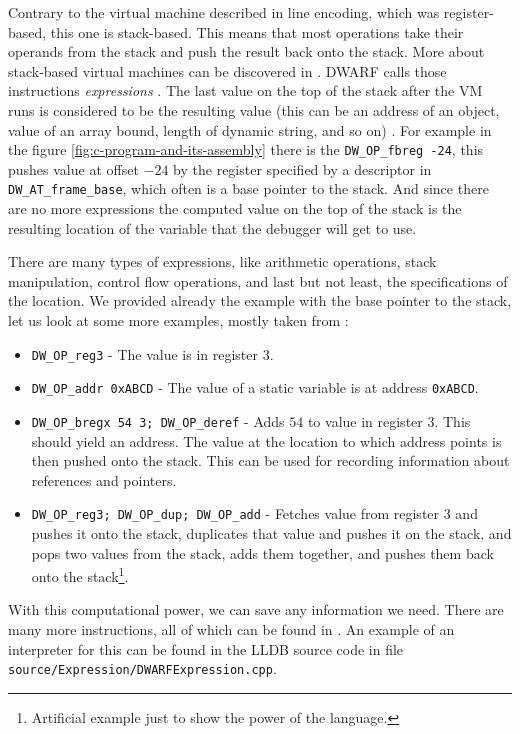 Contrary to the virtual machine described in line encoding, which was
register-based, this one is stack-based. This means that most operations take
their operands from the stack and push the result back onto the stack. More
about stack-based virtual machines can be discovered in
\cite{crafting-interpreters}. DWARF calls those instructions
\textit{expressions} \cite{dwarf}. The last value on the top of the stack after
the VM runs is considered to be the resulting value (this can be an address of
an object, value of an array bound, length of dynamic string, and so on)
\cite{dwarf}. For example in the figure \ref{fig:c-program-and-its-assembly}
there is the \texttt{DW\_OP\_fbreg -24}, this pushes value at offset $-24$ by
the register specified by a descriptor in \texttt{DW\_AT\_frame\_base}, which
often is a base pointer to the stack. And since there are no more expressions
the computed value on the top of the stack is the resulting location of the
variable that the debugger will get to use.

There are many types of expressions, like arithmetic operations, stack
manipulation, control flow operations, and last but not least, the
specifications of the location. We provided already the example with the base
pointer to the stack, let us look at some more examples, mostly taken from
\cite{dwarf}:
\begin{itemize}
    \item \texttt{DW\_OP\_reg3} - The value is in register $3$.
    \item \texttt{DW\_OP\_addr 0xABCD} - The value of a static variable is at
        address \texttt{0xABCD}.
    \item \texttt{DW\_OP\_bregx 54 3; DW\_OP\_deref} - Adds $54$ to value in
        register $3$. This should yield an address. The value at the location
        to which address points is then pushed onto the stack. This can be used
        for recording information about references and pointers.
    \item \texttt{DW\_OP\_reg3; DW\_OP\_dup; DW\_OP\_add} - Fetches value from
        register $3$ and pushes it onto the stack, duplicates that value and
        pushes it on the stack, and pops two values from the stack, adds them
        together, and pushes them back onto the stack\footnote{Artificial
        example just to show the power of the language.}.
\end{itemize}
With this computational power, we can save any information we need. There are
many more instructions, all of which can be found in \cite{dwarf}. An example
of an interpreter for this can be found in the LLDB source code in file
\texttt{source/Expression/DWARFExpression.cpp}.

